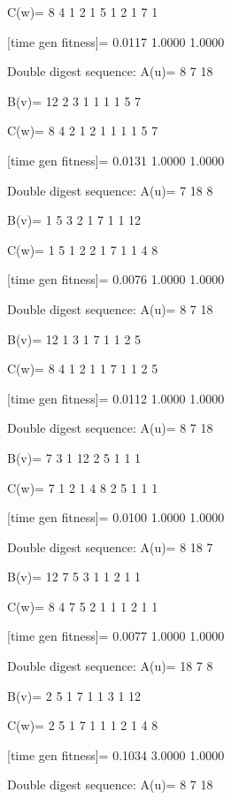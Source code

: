 C(w)=
     8     4     1     2     1     5     1     2     1     7     1

[time gen fitness]=
    0.0117    1.0000    1.0000

Double digest sequence:
A(u)=
     8     7    18

B(v)=
    12     2     3     1     1     1     1     5     7

C(w)=
     8     4     2     1     2     1     1     1     1     5     7

[time gen fitness]=
    0.0131    1.0000    1.0000

Double digest sequence:
A(u)=
     7    18     8

B(v)=
     1     5     3     2     1     7     1     1    12

C(w)=
     1     5     1     2     2     1     7     1     1     4     8

[time gen fitness]=
    0.0076    1.0000    1.0000

Double digest sequence:
A(u)=
     8     7    18

B(v)=
    12     1     3     1     7     1     1     2     5

C(w)=
     8     4     1     2     1     1     7     1     1     2     5

[time gen fitness]=
    0.0112    1.0000    1.0000

Double digest sequence:
A(u)=
     8     7    18

B(v)=
     7     3     1    12     2     5     1     1     1

C(w)=
     7     1     2     1     4     8     2     5     1     1     1

[time gen fitness]=
    0.0100    1.0000    1.0000

Double digest sequence:
A(u)=
     8    18     7

B(v)=
    12     7     5     3     1     1     2     1     1

C(w)=
     8     4     7     5     2     1     1     1     2     1     1

[time gen fitness]=
    0.0077    1.0000    1.0000

Double digest sequence:
A(u)=
    18     7     8

B(v)=
     2     5     1     7     1     1     3     1    12

C(w)=
     2     5     1     7     1     1     1     2     1     4     8

[time gen fitness]=
    0.1034    3.0000    1.0000

Double digest sequence:
A(u)=
     8     7    18

